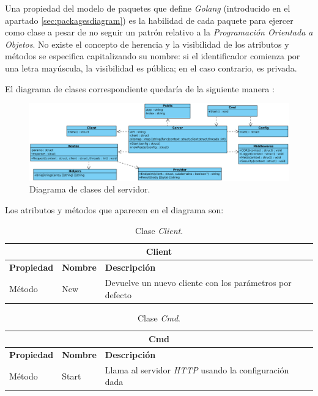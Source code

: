 Una propiedad del modelo de paquetes que define \textit{Golang} \cite{gomod} (introducido en el apartado \ref{sec:packagesdiagram}) es la habilidad de cada paquete para ejercer como clase a pesar de no seguir un patrón relativo a la \textit{Programación Orientada a Objetos}. No existe el concepto de herencia y la visibilidad de los atributos y métodos se especifica capitalizando su nombre: si el identificador comienza por una letra mayúscula, la visibilidad es pública; en el caso contrario, es privada.\sn

El diagrama de clases correspondiente quedaría de la siguiente manera :\sn

\begin{figure}[H]
    \centering
    \includegraphics[width=15cm]{img/tables/21_Class-Diagram-Server.png}
    \caption{Diagrama de clases del servidor.}
    \label{fig:classdiagramserver}
\end{figure}
\newpage

Los atributos y métodos que aparecen en el diagrama son:\sn

\begin{table}[H]
    \begin{center}
        \begin{tabularx}{\textwidth}{| l | l | X |}
            \hline
            \multicolumn{3}{c}{ \textbf{Client} } \\ \hline
            \textbf{Propiedad} & \textbf{Nombre} & \textbf{Descripción} \\ \hline
            Método & New & Devuelve un nuevo cliente con los parámetros por defecto \\ \hline
        \end{tabularx}
    \end{center}
    \caption{Clase \textit{Client}.}
    \label{tab:classClient}
\end{table}

\begin{table}[H]
    \begin{center}
        \begin{tabularx}{\textwidth}{| l | l | X |}
            \hline
            \multicolumn{3}{c}{ \textbf{Cmd} } \\ \hline
            \textbf{Propiedad} & \textbf{Nombre} & \textbf{Descripción} \\ \hline
            Método & Start & Llama al servidor \textit{HTTP} usando la configuración dada\\ \hline
        \end{tabularx}
    \end{center}
    \caption{Clase \textit{Cmd}.}
    \label{tab:classCmd}
\end{table}

